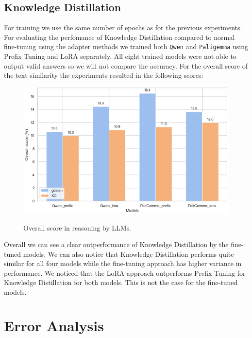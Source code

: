 \documentclass{article}
\begin{document}
\subsection{Knowledge Distillation}
\label{section:experiments:KD}
For training we use the same number of epochs as for the previous experiments.
For evaluating the perfomance of Knowledge Distillation compared to normal fine-tuning using the adapter methods we trained both \texttt{Qwen} and \texttt{Paligemma} using Prefix Tuning and LoRA separately. All eight trained models were not able to output valid answers so we will not compare the accuracy. For the overall score of the text similarity the experiments resulted in the following scores:
\begin{figure}[H]
    \centering
    \includegraphics[width=1\linewidth]{knowledge_distillation_test.png}
    \label{fig:KD_overall}
    \caption{Overall score in reasoning by LLMs.}
\end{figure}
Overall we can see a clear outperformance of Knowledge Distillation by the fine-tuned models. We can also notice that Knowledge Distillation performs quite similar for all four models while the fine-tuning approach has higher variance in performance. We noticed that the LoRA approach outperforms Prefix Tuning for Knowledge Distillation for both models. This is not the case for the fine-tuned models.

\section{Error Analysis}
\label{error-analysis}
\end{document}
